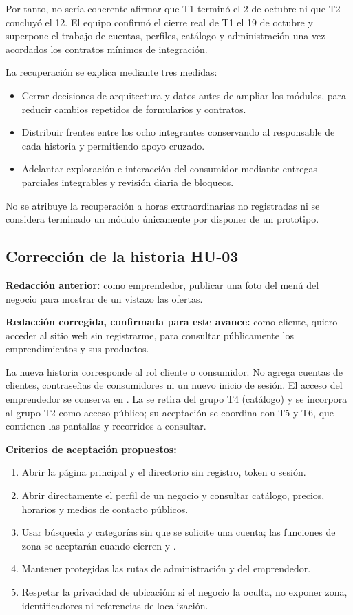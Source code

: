 Por tanto, no sería coherente afirmar que T1 terminó el 2 de octubre ni que
T2 concluyó el 12. El equipo confirmó el cierre real de T1 el 19 de octubre y
superpone el trabajo de cuentas, perfiles, catálogo y administración una vez
acordados los contratos mínimos de integración.

La recuperación se explica mediante tres medidas:
\begin{itemize}
\item Cerrar decisiones de arquitectura y datos antes de ampliar los módulos,
para reducir cambios repetidos de formularios y contratos.
\item Distribuir frentes entre los ocho integrantes conservando al responsable
de cada historia y permitiendo apoyo cruzado.
\item Adelantar exploración e interacción del consumidor mediante entregas
parciales integrables y revisión diaria de bloqueos.
\end{itemize}
No se atribuye la recuperación a horas extraordinarias no registradas ni se
considera terminado un módulo únicamente por disponer de un prototipo.

\subsection{Corrección de la historia HU-03}
\textbf{Redacción anterior:} como emprendedor, publicar una foto del menú del
negocio para mostrar de un vistazo las ofertas.

\textbf{Redacción corregida, confirmada para este avance:} como cliente,
quiero acceder al sitio web sin registrarme, para consultar públicamente los
emprendimientos y sus productos.

La nueva historia corresponde al rol cliente o consumidor. No agrega cuentas
de clientes, contraseñas de consumidores ni un nuevo inicio de sesión.
El acceso del emprendedor se conserva en . La  se retira del
grupo T4 (catálogo) y se incorpora al grupo T2 como acceso público; su
aceptación se coordina con T5 y T6, que contienen las pantallas y recorridos
a consultar.

\textbf{Criterios de aceptación propuestos:}
\begin{enumerate}[nosep,leftmargin=*]
\item Abrir la página principal y el directorio sin registro, token o sesión.
\item Abrir directamente el perfil de un negocio y consultar catálogo,
precios, horarios y medios de contacto públicos.
\item Usar búsqueda y categorías sin que se solicite una cuenta; las
funciones de zona se aceptarán cuando cierren  y .
\item Mantener protegidas las rutas de administración y del emprendedor.
\item Respetar la privacidad de ubicación: si el negocio la oculta, no
exponer zona, identificadores ni referencias de localización.
\end{enumerate}

